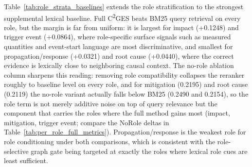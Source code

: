 \documentclass{ieeeaccess}
\begin{document}
\begin{table}[ht]
\centering
\caption{Role-stratified evidence F1 at \(K=3\) for the strongest lexical baseline, the no-role ablation, and the full reranker (all values from the supplement artifact)}
\label{tab:role_strata_baselines}
\end{table}

Table~\ref{tab:role_strata_baselines} extends the role stratification to the strongest supplemental lexical baseline. Full C\textsuperscript{2}GES beats BM25 query retrieval on every role, but the margin is far from uniform: it is largest for impact (+0.1248) and trigger event (+0.0864), where role-specific surface signals such as measured quantities and event-start language are most discriminative, and smallest for propagation/response (+0.0321) and root cause (+0.0440), where the correct evidence is lexically close to neighboring causal context. The no-role ablation column sharpens this reading: removing role compatibility collapses the reranker roughly to baseline level on every role, and for mitigation (0.2195) and root cause (0.2119) the no-role variant actually falls below BM25 (0.2490 and 0.2154), so the role term is not merely additive noise on top of query relevance but the component that carries the roles where the full method gains most (impact, mitigation, trigger event; compare the NoRole deltas in Table~\ref{tab:per_role_full_metrics}). Propagation/response is the weakest role for role conditioning under both comparisons, which is consistent with the role-selective graph gate being targeted at exactly the roles where lexical role cues are least sufficient.
\end{document}
